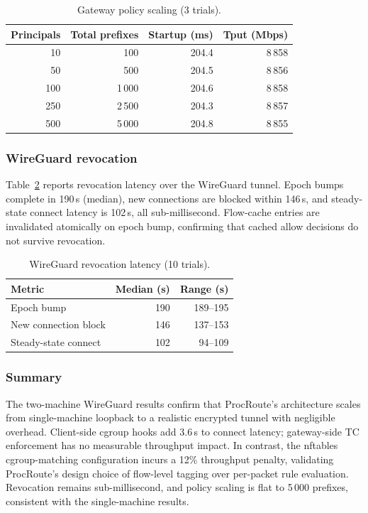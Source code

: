 \documentclass[sigconf]{acmart}
\begin{document}
\begin{table}[t]
\centering
\caption{Gateway policy scaling (3 trials).}
\label{tab:wg:scaling}
\begin{tabular}{rrrr}
\toprule
Principals & Total prefixes & Startup (ms) & Tput (Mbps) \\
\midrule
10  & 100   & 204.4 & 8\,858 \\
50  & 500   & 204.5 & 8\,856 \\
100 & 1\,000 & 204.6 & 8\,858 \\
250 & 2\,500 & 204.3 & 8\,857 \\
500 & 5\,000 & 204.8 & 8\,855 \\
\bottomrule
\end{tabular}
\end{table}

\subsubsection{WireGuard revocation}

Table~\ref{tab:wg:revocation} reports revocation latency over the
WireGuard tunnel.  Epoch bumps complete in 190\,\textmu{}s (median),
new connections are blocked within 146\,\textmu{}s, and
steady-state connect latency is 102\,\textmu{}s, all
sub-millisecond.  Flow-cache entries are invalidated atomically on
epoch bump, confirming
that cached allow decisions do not survive revocation.

\begin{table}[t]
\centering
\caption{WireGuard revocation latency (10 trials).}
\label{tab:wg:revocation}
\begin{tabular}{lrr}
\toprule
Metric & Median (\textmu{}s) & Range (\textmu{}s) \\
\midrule
Epoch bump            & 190 & 189--195 \\
New connection block  & 146 & 137--153 \\
Steady-state connect  & 102 & 94--109 \\
\bottomrule
\end{tabular}
\end{table}

\subsubsection{Summary}

The two-machine WireGuard results confirm that ProcRoute's
architecture scales from single-machine loopback to a realistic
encrypted tunnel with negligible overhead.  Client-side cgroup hooks
add 3.6\,\textmu{}s to connect latency; gateway-side TC enforcement
has no measurable throughput impact.  In contrast, the nftables cgroup-matching
configuration incurs a 12\% throughput penalty, validating ProcRoute's
design choice of flow-level tagging over per-packet rule evaluation.
Revocation remains sub-millisecond, and policy scaling is flat to
5\,000 prefixes, consistent with the single-machine results.
\end{document}
